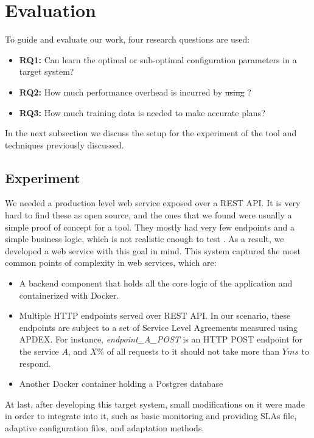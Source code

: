 \section{Evaluation}

To guide and evaluate our work, four research questions are used:

\begin{itemize}
  \item \textbf{RQ1:} Can \projectname{} learn the optimal or sub-optimal configuration parameters in a target system?
  \item \textbf{RQ2:} How much performance overhead is incurred by \st{using} \projectname{}?
  \item \textbf{RQ3:} How much training data is needed to make accurate plans?
\end{itemize}

In the next subsection we discuss the setup for the experiment of the tool and techniques previously discussed.

\subsection{Experiment}

We needed a production level web service exposed over a REST API. It is very hard to find these as open source, and the ones that we found were usually a simple proof of concept for a tool. They mostly had very few endpoints and a simple business logic, which is not realistic enough to test \projectname{}. As a result, we developed a web service with this goal in mind. This system captured the most common points of complexity in web services, which are:

\begin{itemize}
  \item A backend component that holds all the core logic of the application and containerized with Docker.
  \item Multiple HTTP endpoints served over REST API. In our scenario, these endpoints are subject to a set of Service Level Agreements measured using APDEX. For instance, \textit{endpoint\_A\_POST} is an HTTP POST endpoint for the service $A$, and $X\%$ of all requests to it should not take more than $Y ms$ to respond.
  \item Another Docker container holding a Postgres database
\end{itemize}

At last, after developing this target system, small modifications on it were made in order to integrate \projectname{} into it, such as basic monitoring and providing SLAs file, adaptive configuration files, and adaptation methods.

